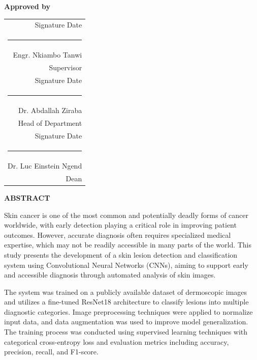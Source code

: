 \documentclass[
  12pt,
  oneside]{article}
\begin{document}
\begin{flushright}
\textbf{Approved by}

\vspace{1.5cm}

\begin{tabular}{@{}r@{}}
Signature \hspace{3cm} Date \\ [0.5cm]
\rule{6cm}{0.15mm} \\ [0.2cm]
Engr. Nkiambo Tanwi \\ [0.3cm]
Supervisor \\[1cm]

Signature \hspace{3cm} Date \\ [0.5cm]
\rule{6cm}{0.15mm} \\ [0.2cm]
Dr. Abdallah Ziraba \\ [0.3cm]
Head of Department \\[1cm]

Signature \hspace{3cm} Date \\ [0.5cm]
\rule{6cm}{0.15mm} \\ [0.2cm]
Dr. Luc Einstein Ngend \\ [0.3cm]
Dean \\
\end{tabular}
\end{flushright}

\vfill
\clearpage

\thispagestyle{empty}
\begin{center}
\textbf{\Large ABSTRACT}
\end{center}

\vspace{1cm}

Skin cancer is one of the most common and potentially deadly forms of cancer worldwide, with early detection playing a critical role in improving patient outcomes. However, accurate diagnosis often requires specialized medical expertise, which may not be readily accessible in many parts of the world. This study presents the development of a skin lesion detection and classification system using Convolutional Neural Networks (CNNs), aiming to support early and accessible diagnosis through automated analysis of skin images.

The system was trained on a publicly available dataset of dermoscopic images and utilizes a fine-tuned ResNet18 architecture to classify lesions into multiple diagnostic categories. Image preprocessing techniques were applied to normalize input data, and data augmentation was used to improve model generalization. The training process was conducted using supervised learning techniques with categorical cross-entropy loss and evaluation metrics including accuracy, precision, recall, and F1-score.
\end{document}

